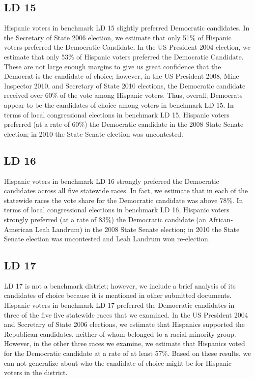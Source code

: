 \documentclass[12pt]{article}
\begin{document}
\subsection{LD 15}
Hispanic voters in benchmark LD 15 slightly preferred Democratic candidates. In the Secretary of State 2006 election, we estimate that only 51\% of Hispanic voters preferred the Democratic Candidate. In the US President 2004 election, we estimate that only 53\% of Hispanic voters preferred the Democratic Candidate. These are not large enough margins to give us great confidence that the Democrat is the candidate of choice; however, in the US President 2008, Mine Inspector 2010, and Secretary of State 2010 elections, the Democratic candidate received over 60\% of the vote among Hispanic voters. Thus, overall, Democrats appear to be the candidates of choice among voters in benchmark LD 15. In terms of local congressional elections in benchmark LD 15, Hispanic voters preferred (at a rate of 60\%) the Democratic candidate in the 2008 State Senate election; in 2010 the State Senate election was uncontested.

\subsection{LD 16}
Hispanic voters in benchmark LD 16 strongly preferred the Democratic candidates across all five statewide races. In fact, we estimate that in each of the statewide races the vote share for the Democratic candidate was above 78\%. In terms of local congressional elections in benchmark LD 16, Hispanic voters strongly preferred (at a rate of 83\%) the Democratic candidate (an African-American Leah Landrum) in the 2008 State Senate election; in 2010 the State Senate election was uncontested and Leah Landrum won re-election.

\subsection{LD 17}

LD 17 is not a benchmark district; however, we include a brief analysis of its candidates of choice because it is mentioned in other submitted documents. 
Hispanic voters in benchmark LD 17 preferred the Democratic candidates in three of the five five statewide races that we examined. In the US President 2004 and Secretary of State 2006 elections, we estimate that Hispanics supported the Republican candidates, neither of whom belonged to a racial minority group. However, in the other three races we examine, we estimate that Hispanics voted for the Democratic candidate at a rate of at least 57\%. Based on these results, we can not generalize about who the candidate of choice might be for Hispanic voters in the district.
\end{document}
